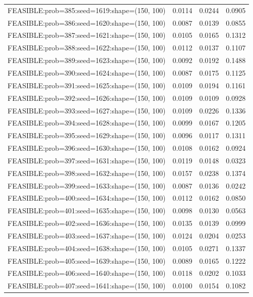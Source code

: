 \begin{longtable}{lccc}
FEASIBLE:prob=385:seed=1619:shape=(150, 100) & 0.0114 & 0.0244 & 0.0905 \\
FEASIBLE:prob=386:seed=1620:shape=(150, 100) & 0.0087 & 0.0139 & 0.0855 \\
FEASIBLE:prob=387:seed=1621:shape=(150, 100) & 0.0105 & 0.0165 & 0.1312 \\
FEASIBLE:prob=388:seed=1622:shape=(150, 100) & 0.0112 & 0.0137 & 0.1107 \\
FEASIBLE:prob=389:seed=1623:shape=(150, 100) & 0.0092 & 0.0192 & 0.1488 \\
FEASIBLE:prob=390:seed=1624:shape=(150, 100) & 0.0087 & 0.0175 & 0.1125 \\
FEASIBLE:prob=391:seed=1625:shape=(150, 100) & 0.0109 & 0.0194 & 0.1161 \\
FEASIBLE:prob=392:seed=1626:shape=(150, 100) & 0.0109 & 0.0109 & 0.0928 \\
FEASIBLE:prob=393:seed=1627:shape=(150, 100) & 0.0109 & 0.0226 & 0.1336 \\
FEASIBLE:prob=394:seed=1628:shape=(150, 100) & 0.0099 & 0.0167 & 0.1205 \\
FEASIBLE:prob=395:seed=1629:shape=(150, 100) & 0.0096 & 0.0117 & 0.1311 \\
FEASIBLE:prob=396:seed=1630:shape=(150, 100) & 0.0108 & 0.0162 & 0.0924 \\
FEASIBLE:prob=397:seed=1631:shape=(150, 100) & 0.0119 & 0.0148 & 0.0323 \\
FEASIBLE:prob=398:seed=1632:shape=(150, 100) & 0.0157 & 0.0238 & 0.1374 \\
FEASIBLE:prob=399:seed=1633:shape=(150, 100) & 0.0087 & 0.0136 & 0.0242 \\
FEASIBLE:prob=400:seed=1634:shape=(150, 100) & 0.0112 & 0.0162 & 0.0850 \\
FEASIBLE:prob=401:seed=1635:shape=(150, 100) & 0.0098 & 0.0130 & 0.0563 \\
FEASIBLE:prob=402:seed=1636:shape=(150, 100) & 0.0135 & 0.0139 & 0.0999 \\
FEASIBLE:prob=403:seed=1637:shape=(150, 100) & 0.0124 & 0.0204 & 0.0253 \\
FEASIBLE:prob=404:seed=1638:shape=(150, 100) & 0.0105 & 0.0271 & 0.1337 \\
FEASIBLE:prob=405:seed=1639:shape=(150, 100) & 0.0089 & 0.0165 & 0.1222 \\
FEASIBLE:prob=406:seed=1640:shape=(150, 100) & 0.0118 & 0.0202 & 0.1033 \\
FEASIBLE:prob=407:seed=1641:shape=(150, 100) & 0.0100 & 0.0154 & 0.1082 \\

\end{longtable}
